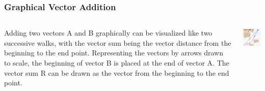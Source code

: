 \documentclass{beamer}
\begin{document}
\begin{frame}\frametitle{Graphical Vector Addition}
\begin{columns}
\begin{column}{6cm}
Adding two vectors A and B graphically can be visualized like two successive walks, with the vector sum being the vector distance from the beginning to the end point. Representing the vectors by arrows drawn to scale, the beginning of vector B is placed at the end of vector A. The vector sum R can be drawn as the vector from the beginning to the end point.
\end{column}
\begin{column}{5cm}

\begin{center}
\includegraphics[width=4.8cm]{fig/vec1.png}
\end{center}
\end{column}
\end{columns}
\end{frame}
\end{document}
